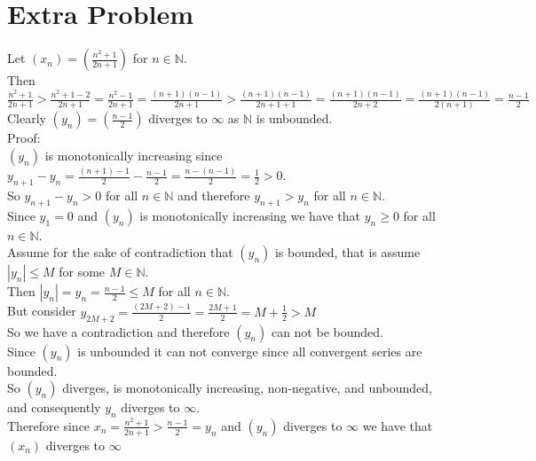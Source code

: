 \documentclass{article}
\begin{document}
\section*{Extra Problem}
\begin{center}
    \doublespacing
    Let $(x_n) = (\frac{n^2 + 1}{2n + 1})$ for $n\in\mathbb{N}$.
    \\Then {\large $\frac{n^2 + 1}{2n + 1} >\frac{n^2 + 1 - 2}{2n + 1} =\frac{n^2 - 1}{2n + 1} =\frac{(n + 1)(n - 1)}{2n + 1} >\frac{(n + 1)(n - 1)}{2n + 1 + 1} =\frac{(n + 1)(n - 1)}{2n + 2} =\frac{(n + 1)(n - 1)}{2(n + 1)} =\frac{n - 1}{2}$}
    \\Clearly $(y_n) = (\frac{n - 1}{2})$ diverges to $\infty$ as $\mathbb{N}$ is unbounded.
    \\Proof:
    \\$(y_n)$ is monotonically increasing since $y_{n+1} - y_n =\frac{(n + 1) - 1}{2} - \frac{n - 1}{2} =\frac{n - (n - 1)}{2} =\frac{1}{2} > 0$.
    \\So $y_{n+1} - y_n > 0$ for all $n\in\mathbb{N}$ and therefore $y_{n+1} > y_n$ for all $n\in\mathbb{N}$.
    \\Since $y_1 = 0$ and $(y_n)$ is monotonically increasing we have that $y_n\geq 0$ for all $n\in\mathbb{N}$.
    \\Assume for the sake of contradiction that $(y_n)$ is bounded, that is assume $|y_n|\leq M$ for some $M\in\mathbb{N}$.
    \\Then $|y_n| = y_n =\frac{n - 1}{2}\leq M$ for all $n\in\mathbb{N}$.
    \\But consider $y_{2M + 2} =\frac{(2M + 2) - 1}{2} =\frac{2M + 1}{2} = M +\frac{1}{2} > M$
    \\So we have a contradiction and therefore $(y_n)$ can not be bounded.
    \\Since $(y_n)$ is unbounded it can not converge since all convergent series are bounded.
    \\So $(y_n)$ diverges, is monotonically increasing, non-negative, and unbounded, and consequently $y_n$ diverges to $\infty$.
    \\Therefore since $x_n =\frac{n^2 + 1}{2n + 1} >\frac{n - 1}{2} = y_n$ and $(y_n)$ diverges to $\infty$ we have that $(x_n)$ diverges to $\infty$ \qedsymbol
\end{center}
\end{document}
